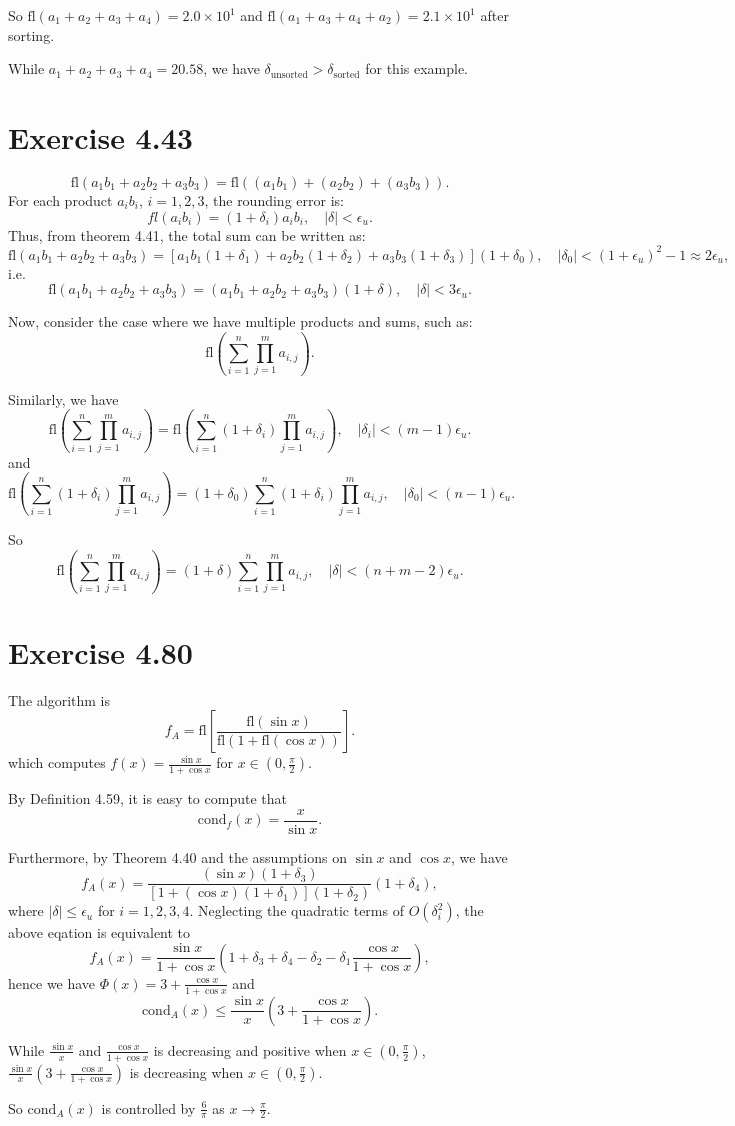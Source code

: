 \documentclass[a4paper]{article}
\begin{document}
So $\text{fl}(a_1+a_2+a_3+a_4)=2.0\times 10^1$ and $\text{fl}(a_1+a_3+a_4+a_2)=2.1\times 10^1$ after sorting.

While $a_1+a_2+a_3+a_4=20.58$, we have $\delta_{\text{unsorted}}> \delta_{\text{sorted}}$ for this example.


\section*{Exercise 4.43}
\[
\text{fl}(a_1b_1 + a_2b_2 + a_3b_3) = \text{fl}\left( (a_1b_1) + (a_2b_2) + (a_3b_3) \right).
\]
For each product \( a_ib_i \), $i=1,2,3$, the rounding error is:
\[
fl(a_ib_i)=(1+\delta_i)a_i b_i, \quad |\delta|<\epsilon_u.
\]
Thus, from theorem 4.41, the total sum can be written as:
\[
\text{fl}(a_1b_1 + a_2b_2 + a_3b_3) = [a_1b_1(1+\delta_1) + a_2b_2(1+\delta_2) + a_3b_3(1+\delta_3)](1+\delta_0), \quad |\delta_0|<(1+\epsilon_u)^2-1\approx 2 \epsilon_u,
\]
i.e. 
$$
\text{fl}(a_1b_1 + a_2b_2 + a_3b_3)=(a_1b_1 + a_2b_2 + a_3b_3)(1+\delta), \quad |\delta|< 3\epsilon_u.
$$

Now, consider the case where we have multiple products and sums, such as:
\[
\text{fl}\left( \sum_{i=1}^{n} \prod_{j=1}^{m} a_{i,j} \right).
\]

Similarly, we have
$$
\text{fl}\left( \sum_{i=1}^{n} \prod_{j=1}^{m} a_{i,j} \right)=\text{fl}\left( \sum_{i=1}^{n}(1+\delta_i) \prod_{j=1}^{m} a_{i,j} \right), \quad |\delta_i|<(m-1)\epsilon_u.
$$
and
$$
\text{fl}\left( \sum_{i=1}^{n}(1+\delta_i) \prod_{j=1}^{m} a_{i,j} \right)=(1+\delta_0)\sum_{i=1}^{n} (1+\delta_i)\prod_{j=1}^{m} a_{i,j}, \quad |\delta_0|<(n-1)\epsilon_u.
$$

So 
$$
\text{fl}\left( \sum_{i=1}^{n} \prod_{j=1}^{m} a_{i,j} \right)=(1+\delta)\sum_{i=1}^{n} \prod_{j=1}^{m} a_{i,j}, \quad |\delta|<(n+m-2)\epsilon_u.
$$

\section*{Exercise 4.80}
The algorithm is 
$$
f_A=\text{fl}\left[\dfrac{\text{fl}(\sin x)}{\text{fl}(1+\text{fl}(\cos x))}\right].
$$
which computes $f(x)=\frac{\sin x}{1+\cos x}$ for $x\in(0,\frac{\pi}{2})$.

By Definition 4.59, it is easy to compute that 
$$
\text{cond}_f(x)=\frac{x}{\sin x}.
$$

Furthermore, by Theorem 4.40 and the assumptions on $\sin x$ and $\cos x$, we have
$$
f_A(x)=\frac{(\sin x)(1+\delta_3)}{[1+(\cos x)(1+\delta_1)](1+\delta_2)}(1+\delta_4),
$$
where $|\delta| \leq \epsilon_u$ for $i=1,2,3,4$. Neglecting the quadratic terms of $O(\delta ^2_i)$, the above eqation is equivalent to 
$$
f_A(x)=\frac{\sin x}{1+\cos x}(1+\delta_3+\delta_4-\delta_2-\delta_1\frac{\cos x}{1+\cos x}),
$$
hence we have $\Phi(x)=3+\frac{\cos x}{1+\cos x}$ and 
$$
\text{cond}_A(x)\leq \frac{\sin x}{x}(3+\frac{\cos x}{1+\cos x}).
$$

While $\frac{\sin x}{x}$ and $\frac{\cos x}{1+\cos x}$ is decreasing and positive when $x\in(0,\frac{\pi}{2})$, $\frac{\sin x}{x}(3+\frac{\cos x}{1+\cos x})$ is decreasing when $x\in(0,\frac{\pi}{2})$.

So $\text{cond}_A(x)$ is controlled by $\frac{6}{\pi}$ as $x\rightarrow \frac{\pi}{2}$.
\end{document}
